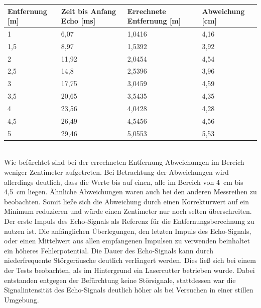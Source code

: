 \begin{minipage}{1\textwidth}
\begin{tabularx}{\textwidth}{|p{}|p{}|p{}|X|}
\hline
Entfernung [m]& Zeit bis Anfang Echo [ms]  & Errechnete Entfernung [m] & Abweichung [cm]\\
\hline
1 & 6,07 & 1,0416 & 4,16\\
\hline
1,5 & 8,97 & 1,5392 & 3,92\\
\hline
2 & 11,92 & 2,0454 & 4,54\\
\hline
2,5 & 14,8 & 2,5396 & 3,96\\
\hline
3 & 17,75 & 3,0459 & 4,59\\
\hline
3,5 & 20,65 & 3,5435 & 4,35\\
\hline
4 & 23,56 & 4,0428 & 4,28\\
\hline
4,5 & 26,49 & 4,5456 & 4,56\\
\hline
5 & 29,46 & 5,0553 & 5,53\\
\hline
\end{tabularx}

\label{tab:Entfernungsmessung}
\end{minipage}\\


Wie befürchtet sind bei der errechneten Entfernung Abweichungen im Bereich weniger Zentimeter aufgetreten. Bei Betrachtung der Abweichungen wird allerdings deutlich, dass die Werte bis auf einen, alle im Bereich von 4~cm bis 4,5~cm liegen. Ähnliche Abweichungen waren auch bei den anderen Messreihen zu beobachten. Somit ließe sich die Abweichung durch einen Korrekturwert auf ein Minimum reduzieren und würde einen Zentimeter nur noch selten überschreiten. Der erste Impuls des Echo-Signals als Referenz für die Entfernungsberechnung zu nutzen ist. Die anfänglichen Überlegungen, den letzten Impuls des Echo-Signals, oder einen Mittelwert aus allen empfangenen Impulsen zu verwenden beinhaltet ein höheres Fehlerpotential. Die Dauer des Echo-Signals kann durch niederfrequente Störgeräusche deutlich verlängert werden. Dies ließ sich bei einem der Tests beobachten, als im Hintergrund ein Lasercutter betrieben wurde. Dabei entstanden entgegen der Befürchtung keine Störsignale, stattdessen war die Signalintensität des Echo-Signals deutlich höher als bei Versuchen in einer stillen Umgebung. 
